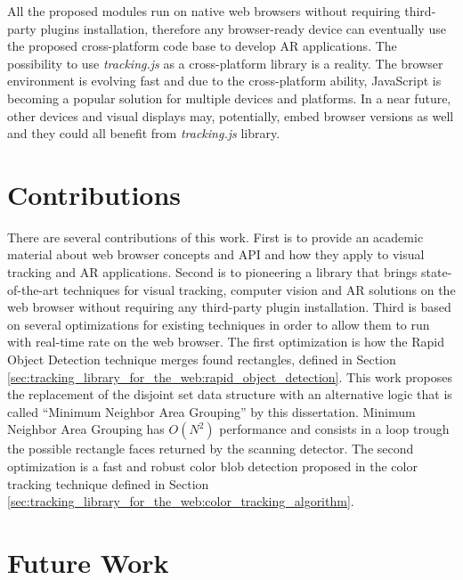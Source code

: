 All the proposed modules run on native web browsers without requiring third-party plugins installation, therefore any browser-ready device can eventually use the proposed cross-platform code base to develop AR applications. The possibility to use \textit{tracking.js} as a cross-platform library is a reality. The browser environment is evolving fast and due to the cross-platform ability, JavaScript is becoming a popular solution for multiple devices and platforms. In a near future, other devices and visual displays may, potentially, embed browser versions as well and they could all benefit from \textit{tracking.js} library.

\section{Contributions} %
\label{sec:conclusion:contributions}

There are several contributions of this work. First is to provide an academic material about web browser concepts and API and how they apply to visual tracking and AR applications. Second is to pioneering a library that brings state-of-the-art techniques for visual tracking, computer vision and AR solutions on the web browser without requiring any third-party plugin installation. Third is based on several optimizations for existing techniques in order to allow them to run with real-time rate on the web browser. The first optimization is how the Rapid Object Detection technique   merges found rectangles, defined in Section \ref{sec:tracking_library_for_the_web:rapid_object_detection}. This work proposes the replacement of the disjoint set data structure with an alternative logic that is called ``Minimum Neighbor Area Grouping'' by this dissertation. Minimum Neighbor Area Grouping has $O(N^2)$ performance \cite{black2007big} and consists in a loop trough the possible rectangle faces returned by the scanning detector. The second optimization is a fast and robust color blob detection proposed in the color tracking technique defined in Section \ref{sec:tracking_library_for_the_web:color_tracking_algorithm}.


\section{Future Work} %
\label{sec:conclusion:future_work}

